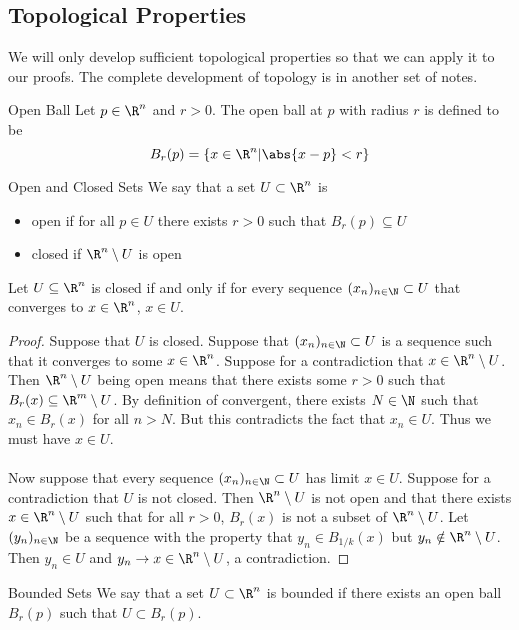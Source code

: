 \documentclass[a4paper]{article}
\begin{document}
\subsection{Topological Properties}
We will only develop sufficient topological properties so that we can apply it to our proofs. The complete development of topology is in another set of notes. 

\begin{defn}{Open Ball}{} Let $p\in\R^n$ and $r>0$. The open ball at $p$ with radius $r$ is defined to be $$B_r(p)=\{x\in\R^n|\abs{x-p}<r\}$$
\end{defn}

\begin{defn}{Open and Closed Sets}{} We say that a set $U\subset\R^n$ is 
\begin{itemize}
\item open if for all $p\in U$ there exists $r>0$ such that $B_r(p)\subseteq U$
\item closed if $\R^n\setminus U$ is open
\end{itemize}
\end{defn}

\begin{prp}{}{} Let $U\subseteq\R^n$ is closed if and only if for every sequence $(x_n)_{n\in\N}\subset U$ that converges to $x\in\R^n$, $x\in U$. \tcbline
\begin{proof}
Suppose that $U$ is closed. Suppose that $(x_n)_{n\in\N}\subset U$ is a sequence such that it converges to some $x\in\R^n$. Suppose for a contradiction that $x\in\R^n\setminus U$. Then $\R^n\setminus U$ being open means that there exists some $r>0$ such that $B_r(x)\subseteq\R^m\setminus U$. By definition of convergent, there exists $N\in\N$ such that $x_n\in B_r(x)$ for all $n>N$. But this contradicts the fact that $x_n\in U$. Thus we must have $x\in U$. \\~\\
Now suppose that every sequence $(x_n)_{n\in\N}\subset U$ has limit $x\in U$. Suppose for a contradiction that $U$ is not closed. Then $\R^n\setminus U$ is not open and that there exists $x\in\R^n\setminus U$ such that for all $r>0$, $B_r(x)$ is not a subset of $\R^n\setminus U$. Let $(y_n)_{n\in\N}$ be a sequence with the property that $y_n\in B_{1/k}(x)$ but $y_n\notin\R^n\setminus U$. Then $y_n\in U$ and $y_n\to x\in\R^n\setminus U$, a contradiction. 
\end{proof}
\end{prp}

\begin{defn}{Bounded Sets}{} We say that a set $U\subset\R^n$ is bounded if there exists an open ball $B_r(p)$ such that $U\subset B_r(p)$. 
\end{defn}
\end{document}
